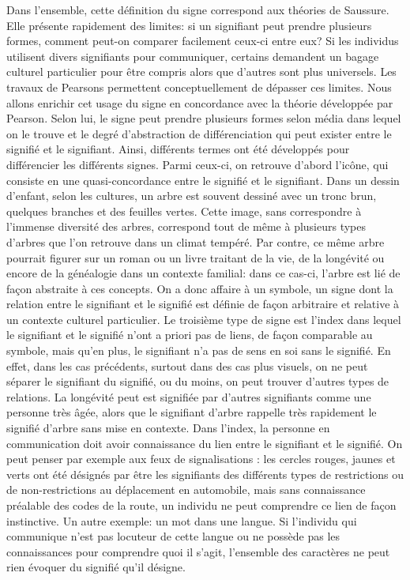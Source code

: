 Dans l'ensemble, cette définition du signe correspond aux théories de Saussure.
Elle présente rapidement des limites: si un signifiant peut prendre plusieurs formes, comment peut-on comparer facilement ceux-ci entre eux? 
Si les individus utilisent divers signifiants pour communiquer, certains demandent un bagage culturel particulier pour être compris alors que d'autres sont plus universels.
Les travaux de Pearsons permettent conceptuellement de dépasser ces limites.
Nous allons enrichir cet usage du signe en concordance avec la théorie développée par Pearson. 
Selon lui, le signe peut prendre plusieurs formes selon média dans lequel on le trouve et le degré d'abstraction de différenciation qui peut exister entre le signifié et le signifiant. 
Ainsi, différents termes ont été développés pour différencier les différents signes.
Parmi ceux-ci, on retrouve d'abord l'icône, qui consiste en une quasi-concordance entre le signifié et le signifiant. 
Dans un dessin d'enfant, selon les cultures, un arbre est souvent dessiné avec un tronc brun, quelques branches et des feuilles vertes. 
Cette image, sans correspondre à l'immense diversité des arbres, correspond tout de même à plusieurs types d'arbres que l'on retrouve dans un climat tempéré. 
Par contre, ce même arbre pourrait figurer sur un roman ou un livre traitant de la vie, de la longévité ou encore de la généalogie dans un contexte familial: dans ce cas-ci, l'arbre est lié de façon abstraite à ces concepts. 
On a donc affaire à un symbole, un signe dont la relation entre le signifiant et le signifié est définie de façon arbitraire et relative à un contexte culturel particulier. 
Le troisième type de signe est l'index dans lequel le signifiant et le signifié n'ont a priori pas de liens, de façon comparable au symbole, mais qu'en plus, le signifiant n'a pas de sens en soi sans le signifié. 
En effet, dans les cas précédents, surtout dans des cas plus visuels, on ne peut séparer le signifiant du signifié, ou du moins, on peut trouver d'autres types de relations. 
La longévité peut est signifiée par d'autres signifiants comme une personne très âgée, alors que le signifiant d'arbre rappelle très rapidement le signifié d'arbre sans mise en contexte. 
Dans l'index, la personne en communication doit avoir connaissance du lien entre le signifiant et le signifié. 
On peut penser par exemple aux feux de signalisations : les cercles rouges, jaunes et verts ont été désignés par être les signifiants des différents types de restrictions ou de non-restrictions au déplacement en automobile, mais sans connaissance préalable des codes de la route, un individu ne peut comprendre ce lien de façon instinctive. 
Un autre exemple: un mot dans une langue. 
Si l'individu qui communique n'est pas locuteur de cette langue ou ne possède pas les connaissances pour comprendre quoi il s'agit, l'ensemble des caractères ne peut rien évoquer du signifié qu'il désigne.

